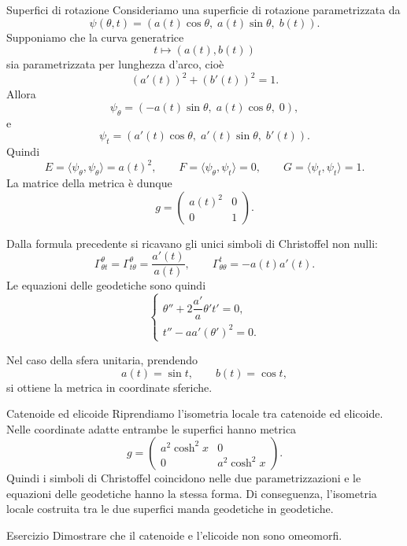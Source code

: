 \documentclass[a4paper]{article}
\begin{document}
\begin{snippetexample}{Superfici di rotazione}
Consideriamo una superficie di rotazione parametrizzata da
\[
    \psi(\theta,t)
    =
    (a(t)\cos\theta,\;a(t)\sin\theta,\;b(t)).
\]
Supponiamo che la curva generatrice
\[
    t\longmapsto (a(t),b(t))
\]
sia parametrizzata per lunghezza d'arco, cioè
\[
    (a'(t))^2+(b'(t))^2=1.
\]
Allora
\[
    \psi_\theta
    =
    (-a(t)\sin\theta,\;a(t)\cos\theta,\;0),
\]
e
\[
    \psi_t
    =
    (a'(t)\cos\theta,\;a'(t)\sin\theta,\;b'(t)).
\]
Quindi
\[
    E=\langle\psi_\theta,\psi_\theta\rangle=a(t)^2,
    \qquad
    F=\langle\psi_\theta,\psi_t\rangle=0,
    \qquad
    G=\langle\psi_t,\psi_t\rangle=1.
\]
La matrice della metrica è dunque
\[
    g
    =
    \begin{pmatrix}
        a(t)^2 & 0\\
        0 & 1
    \end{pmatrix}.
\]

Dalla formula precedente si ricavano gli unici simboli di Christoffel non nulli:
\[
    \Gamma^\theta_{\theta t}
    =
    \Gamma^\theta_{t\theta}
    =
    \frac{a'(t)}{a(t)},
    \qquad
    \Gamma^t_{\theta\theta}
    =
    -a(t)a'(t).
\]
Le equazioni delle geodetiche sono quindi
\[
    \begin{cases}
        \theta''+2\dfrac{a'}{a}\theta't'=0,\\[1.2em]
        t''-aa'(\theta')^2=0.
    \end{cases}
\]

Nel caso della sfera unitaria, prendendo
\[
    a(t)=\sin t,
    \qquad
    b(t)=\cos t,
\]
si ottiene la metrica in coordinate sferiche.
\end{snippetexample}

\begin{snippetexample}{Catenoide ed elicoide}
Riprendiamo l'isometria locale tra catenoide ed elicoide. Nelle coordinate adatte entrambe le superfici hanno metrica
\[
    g
    =
    \begin{pmatrix}
        a^2\cosh^2x & 0\\
        0 & a^2\cosh^2x
    \end{pmatrix}.
\]
Quindi i simboli di Christoffel coincidono nelle due parametrizzazioni e le equazioni delle geodetiche hanno la stessa forma. Di conseguenza, l'isometria locale costruita tra le due superfici manda geodetiche in geodetiche.
\end{snippetexample}

\begin{snippetexample}{Esercizio}
Dimostrare che il catenoide e l'elicoide non sono omeomorfi.
\end{snippetexample}
\end{document}
